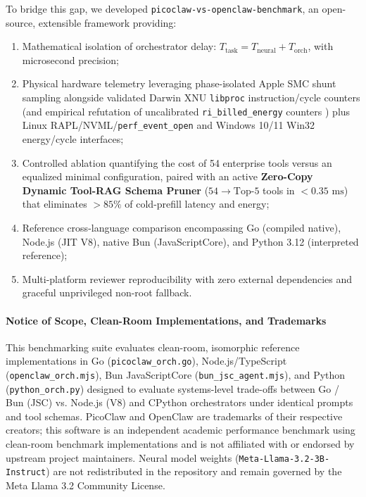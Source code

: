 \documentclass[11pt,a4paper]{article}
\begin{document}
To bridge this gap, we developed \texttt{picoclaw-vs-openclaw-benchmark}, an open-source, extensible framework providing:
\begin{enumerate}
    \item Mathematical isolation of orchestrator delay: $T_{\text{task}} = T_{\text{neural}} + T_{\text{orch}}$, with microsecond precision;
    \item Physical hardware telemetry leveraging phase-isolated Apple SMC shunt sampling alongside validated Darwin XNU \texttt{libproc} instruction/cycle counters (and empirical refutation of uncalibrated \texttt{ri\_billed\_energy} counters \cite{fahad2019comparative, weaver2013nondeterminism}) plus Linux RAPL/NVML/\texttt{perf\_event\_open} and Windows 10/11 Win32 energy/cycle interfaces;
    \item Controlled ablation quantifying the cost of 54 enterprise tools versus an equalized minimal configuration, paired with an active \textbf{Zero-Copy Dynamic Tool-RAG Schema Pruner} ($54 \rightarrow \text{Top-}5$ tools in $<0.35\text{ ms}$) that eliminates $>85\%$ of cold-prefill latency and energy;
    \item Reference cross-language comparison encompassing Go (compiled native), Node.js (JIT V8), native Bun (JavaScriptCore), and Python 3.12 (interpreted reference);
    \item Multi-platform reviewer reproducibility with zero external dependencies and graceful unprivileged non-root fallback.
\end{enumerate}

\paragraph{Notice of Scope, Clean-Room Implementations, and Trademarks}
This benchmarking suite evaluates clean-room, isomorphic reference implementations in Go (\texttt{picoclaw\_orch.go}), Node.js/TypeScript (\texttt{openclaw\_orch.mjs}), Bun JavaScriptCore (\texttt{bun\_jsc\_agent.mjs}), and Python (\texttt{python\_orch.py}) designed to evaluate systems-level trade-offs between Go / Bun (JSC) vs. Node.js (V8) and CPython orchestrators under identical prompts and tool schemas. PicoClaw and OpenClaw are trademarks of their respective creators; this software is an independent academic performance benchmark using clean-room benchmark implementations and is not affiliated with or endorsed by upstream project maintainers. Neural model weights (\texttt{Meta-Llama-3.2-3B-Instruct}) are not redistributed in the repository and remain governed by the Meta Llama 3.2 Community License.
\end{document}
